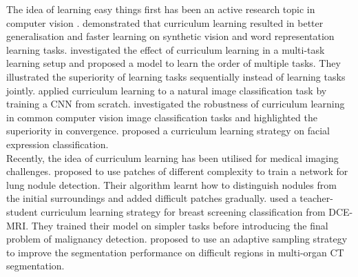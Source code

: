 \documentclass[preprint,12pt,authoryear]{elsarticle}
\begin{document}
The idea of learning easy things first has been an active research topic in computer vision \citep{Lee2011}. \cite{Bengio2009} demonstrated that curriculum learning resulted in better generalisation and faster learning on synthetic vision and word representation  learning  tasks.  \cite{Pentina2015}  investigated the  effect  of  curriculum  learning  in a multi-task learning setup and proposed a model to learn the order of multiple tasks. They illustrated the superiority of learning tasks sequentially instead of learning tasks jointly. \cite{Avramova2015} applied curriculum learning to a natural image classification task by training a CNN from scratch. \cite{Weinshall2018} investigated the robustness of curriculum learning in common computer vision image classification tasks and highlighted the superiority in convergence. \cite{Gui2017} proposed a curriculum learning strategy on facial expression classification.\\


Recently, the idea of curriculum learning has been utilised for medical imaging challenges. \cite{Jesson2017} proposed to use patches of different complexity to train a network for lung nodule detection. Their algorithm learnt how to distinguish nodules from the initial surroundings and added difficult patches gradually.
\cite{Maicas2018} used a teacher-student curriculum learning strategy for breast screening classification from DCE-MRI. They trained their model on simpler tasks before introducing the final problem of malignancy detection.
\cite{Berger2018} proposed to use an adaptive sampling strategy to improve the segmentation performance on difficult regions in multi-organ CT segmentation.
\end{document}
